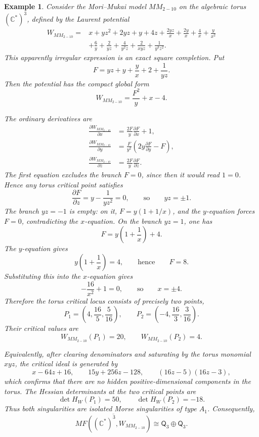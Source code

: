 \documentclass[11pt]{amsart}
\newtheorem{example}{Example}[section]
\newcommand{\MorseCat}[1]{\mathsf{Q}_{#1}}
\begin{document}
\begin{example}
Consider the Mori--Mukai model $MM_{2-10}$ on the algebraic torus
$(\mathbb{C}^*)^3$, defined by the Laurent potential
\begin{align*}
W_{MM_{2-10}}={}&x+yz^2+2yz+y+4z+\frac{2yz}{x}
+\frac{2y}{x}+\frac{4}{x}+\frac{y}{x^2} \\
&+\frac{6}{y}+\frac{2}{yz}+\frac{4}{y^2z}
+\frac{2}{xyz}+\frac{1}{y^3z^2}.
\end{align*}
This apparently irregular expression is an exact square completion. Put
\[
F=yz+y+\frac{y}{x}+2+\frac{1}{yz}.
\]
Then the potential has the compact global form
\[
W_{MM_{2-10}}=\frac{F^2}{y}+x-4.
\]

The ordinary derivatives are
\begin{align*}
\frac{\partial W_{MM_{2-10}}}{\partial x}
&=\frac{2F}{y}\frac{\partial F}{\partial x}+1,\\
\frac{\partial W_{MM_{2-10}}}{\partial y}
&=\frac{F}{y^2}\left(2y\frac{\partial F}{\partial y}-F\right),\\
\frac{\partial W_{MM_{2-10}}}{\partial z}
&=\frac{2F}{y}\frac{\partial F}{\partial z}.
\end{align*}
The first equation excludes the branch $F=0$, since then it would read
$1=0$. Hence any torus critical point satisfies
\[
\frac{\partial F}{\partial z}=y-\frac{1}{yz^2}=0,
\qquad\text{so}\qquad
yz=\pm1.
\]
The branch $yz=-1$ is empty: on it, $F=y(1+1/x)$, and the $y$-equation forces
$F=0$, contradicting the $x$-equation. On the branch $yz=1$, one has
\[
F=y\left(1+\frac{1}{x}\right)+4.
\]
The $y$-equation gives
\[
y\left(1+\frac{1}{x}\right)=4,
\qquad\text{hence}\qquad
F=8.
\]
Substituting this into the $x$-equation gives
\[
-\frac{16}{x^2}+1=0,
\qquad\text{so}\qquad
x=\pm4.
\]
Therefore the torus critical locus consists of precisely two points,
\[
P_1=\left(4,\frac{16}{5},\frac{5}{16}\right),
\qquad
P_2=\left(-4,\frac{16}{3},\frac{3}{16}\right).
\]
Their critical values are
\[
W_{MM_{2-10}}(P_1)=20,
\qquad
W_{MM_{2-10}}(P_2)=4.
\]

Equivalently, after clearing denominators and saturating by the torus monomial
$xyz$, the critical ideal is generated by
\[
x-64z+16,
\qquad
15y+256z-128,
\qquad
(16z-5)(16z-3),
\]
which confirms that there are no hidden positive-dimensional components in the
torus. The Hessian determinants at the two critical points are
\[
\det H_W(P_1)=50,
\qquad
\det H_W(P_2)=-18.
\]
Thus both singularities are isolated Morse singularities of type $A_1$.
Consequently,
\[
\overline{MF((\mathbb{C}^*)^3,W_{MM_{2-10}})}
\cong \MorseCat{3}\oplus \MorseCat{3}.
\]
\end{example}
\end{document}
